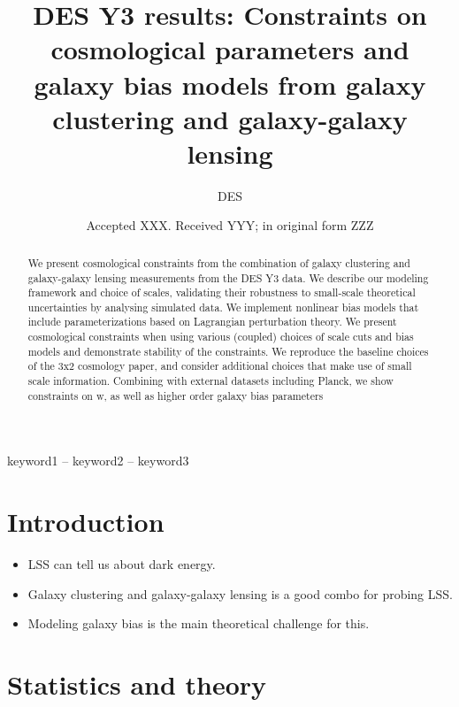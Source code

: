 \documentclass[fleqn,usenatbib]{mnras}
\title[Short title, max. 45 characters]{DES Y3 results: Constraints on cosmological parameters and galaxy bias models from galaxy clustering and galaxy-galaxy lensing}
\author[DES et al.]{
DES
}
\date{Accepted XXX. Received YYY; in original form ZZZ}
\begin{document}
\label{firstpage}
\pagerange{\pageref{firstpage}--\pageref{lastpage}}
\maketitle

\begin{abstract}
We present cosmological constraints from the combination of galaxy clustering and galaxy-galaxy lensing measurements from the DES Y3 data. We describe our modeling framework and choice of scales, validating their robustness to small-scale theoretical uncertainties by analysing simulated data. We implement nonlinear bias models that include parameterizations based on Lagrangian perturbation theory. We present cosmological constraints when using various (coupled) choices of scale cuts and bias models and demonstrate stability of the constraints. We reproduce the baseline choices of the 3x2 cosmology paper, and consider additional choices that make use of small scale information.  Combining with external datasets including Planck, we show constraints on w, as well as higher order galaxy bias parameters
\end{abstract}

\begin{keywords}
keyword1 -- keyword2 -- keyword3
\end{keywords}



\section{Introduction}

\begin{itemize}
    \item LSS can tell us about dark energy.
    \item Galaxy clustering and galaxy-galaxy lensing is a good combo for probing LSS.
    \item Modeling galaxy bias is the main theoretical challenge for this.
\end{itemize}

\section{Statistics and theory}
\end{document}

